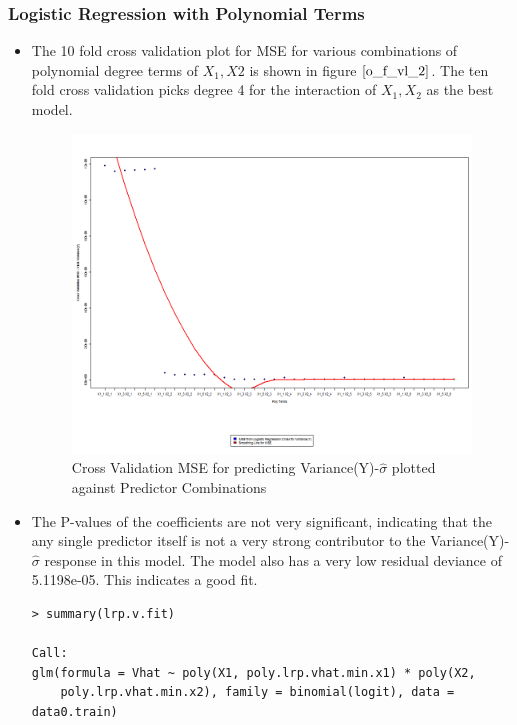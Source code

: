 \documentclass[twoside,12pt]{article}
\begin{document}
\subsubsection{Logistic Regression with Polynomial Terms}
\begin{itemize}
\FloatBarrier
\item
The 10 fold cross validation plot for MSE for various combinations of polynomial degree terms of $X_1,X2$ is shown in figure $\eqref{o_f_vl_2}$. The ten fold cross validation picks degree 4 for the interaction of $X_1,X_2$ as the best model. 

\FloatBarrier
\begin{figure}[!htbp]
\centering
\includegraphics[scale=.50]{images/mt_cvplot_v_lg_poly.png} 
\caption{Cross Validation MSE for predicting Variance(Y)-$\hat{\sigma}$ plotted against Predictor Combinations}
\label{o_f_vl_2}
\end{figure}

\item
The P-values of the coefficients are not very significant, indicating that the any single predictor itself is not a very strong contributor to the Variance(Y)-$\hat{\sigma}$ response in this model. The model also has a very low residual deviance of 5.1198e-05. This indicates a good fit.
\FloatBarrier
\begin{verbatim}
> summary(lrp.v.fit)

Call:
glm(formula = Vhat ~ poly(X1, poly.lrp.vhat.min.x1) * poly(X2, 
    poly.lrp.vhat.min.x2), family = binomial(logit), data = data0.train)


\end{verbatim}
\end{itemize}
\end{document}
